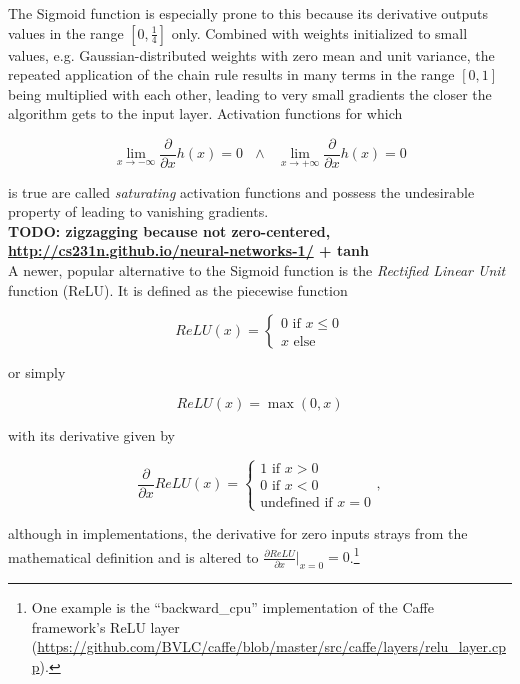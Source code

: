 The Sigmoid function is especially prone to this because its derivative outputs values in the range $\left [0, \frac{1}{4} \right ]$ only. Combined with weights initialized to small values, e.g. Gaussian-distributed weights with zero mean and unit variance, the repeated application of the chain rule results in many terms in the range $\left [0, 1\right ]$ being multiplied with each other, leading to very small gradients the closer the algorithm gets to the input layer.\cite{glorot} Activation functions for which

\[ \lim \limits_{x \rightarrow -\infty} \frac{\partial}{\partial x} h(x) = 0 \,\,\,\, \land \,\,\,\,  \lim \limits_{x \rightarrow +\infty} \frac{\partial}{\partial x} h(x) = 0 \]

\noindent is true are called \textit{saturating} activation functions and possess the undesirable property of leading to vanishing gradients.\\ 
 \textbf{TODO: zigzagging because not zero-centered, \url{http://cs231n.github.io/neural-networks-1/} + tanh}\\

\noindent A newer, popular alternative to the Sigmoid function is the \textit{Rectified Linear Unit} function (ReLU). It is defined as the piecewise function

\[  ReLU(x) = \begin{cases}
			0 \text{ if } x \leq 0\\
			x \text{ else}
		 \end{cases}
\] 

\noindent or simply

\[ ReLU(x) = \max(0, x) \]

\noindent with its derivative given by 

\[ \frac{\partial}{\partial x} ReLU(x) = \begin{cases}
							1 \text { if } x > 0\\
							0 \text { if } x < 0\\
							 \text{undefined if } x = 0
						        \end{cases},
\]

\noindent although in implementations, the derivative for zero inputs strays from the mathematical definition and is altered to $\frac{\partial ReLU}{\partial x}\rvert_{x=0} = 0$.\footnote{One example is the ``backward\_cpu'' implementation of the Caffe framework's ReLU layer (\url{https://github.com/BVLC/caffe/blob/master/src/caffe/layers/relu_layer.cpp}).}

